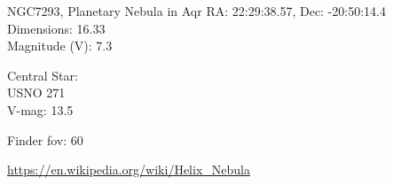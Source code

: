 \begin{block}{NGC7293, Planetary Nebula in Aqr}
    RA: 22:29:38.57, Dec: -20:50:14.4 \\ 
    Dimensions: 16.33 \\ 
    Magnitude (V): 7.3


    Central Star: \\ 
      \hspace{1em}USNO 271 \\ 
      \hspace{1em}V-mag: 13.5 


    Finder fov: 60 

    \url{https://en.wikipedia.org/wiki/Helix_Nebula} 
\end{block}